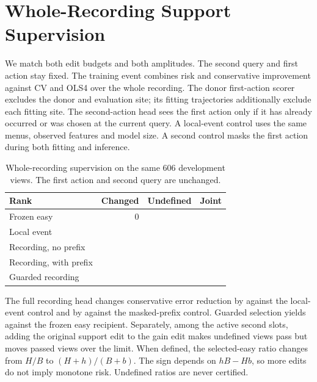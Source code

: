 \section{Whole-Recording Support Supervision}

We match both edit budgets and both amplitudes. The second query
and first action stay fixed. The training event combines risk
and conservative improvement against CV and OLS4 over the
whole recording. The donor first-action scorer excludes the
donor and evaluation site; its fitting trajectories additionally
exclude each fitting site. The second-action head sees the first
action only if it has already occurred or was chosen at the
current query. A local-event control uses the same menus,
observed features and model size. A second control masks the
first action during both fitting and inference.

\begin{table}[h]
\centering
\caption{Whole-recording supervision on the same 606 development
views. The first action and second query are unchanged.}
\small
\begin{tabular}{lrrr}
\toprule
Rank & Changed & Undefined & Joint \\
\midrule
Frozen easy & 0 & \RecordSupportEasyUndefined{} & \RecordSupportEasyJoint{} \\
Local event & \RecordSupportLocalChanged{} & \RecordSupportLocalUndefined{} & \RecordSupportLocalJoint{} \\
Recording, no prefix & \RecordSupportNoPrefixChanged{} & \RecordSupportNoPrefixUndefined{} & \RecordSupportNoPrefixJoint{} \\
Recording, with prefix & \RecordSupportPrefixChanged{} & \RecordSupportPrefixUndefined{} & \RecordSupportPrefixJoint{} \\
Guarded recording & \RecordSupportGuardChanged{} & \RecordSupportGuardUndefined{} & \RecordSupportGuardJoint{} \\
\bottomrule
\end{tabular}
\end{table}

The full recording head changes conservative error reduction
by \RecordSupportLabelEffect{} against the local-event control
and by \RecordSupportContextEffect{} against the masked-prefix
control. Guarded selection yields \RecordSupportGuardEffect{}
against the frozen easy recipient.
Separately, among the \RecordSupportAuditCount{} active second slots,
adding the original support edit to the gain edit makes
\RecordSupportNewPass{} undefined views pass but moves
\RecordSupportLostPass{} passed views over the limit. When defined,
the selected-easy ratio changes from $H/B$ to $(H+h)/(B+b)$.
The sign depends on $hB-Hb$, so more edits do not imply
monotone risk. Undefined ratios are never certified.
